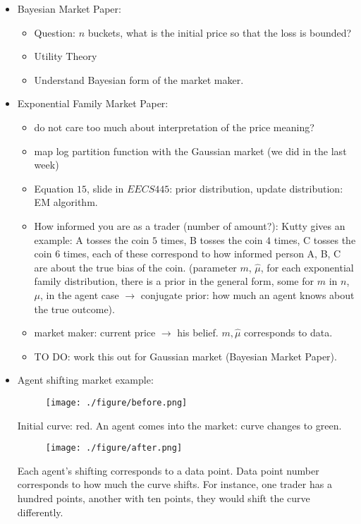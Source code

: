 \documentclass{article}
\begin{document}
\begin{itemize}
\item Bayesian Market Paper: 
	\begin{itemize}
		\item Question: $n$ buckets, what is the initial price so that the loss is bounded?
		\item Utility Theory
		\item Understand Bayesian form of the market maker.
	\end{itemize} 
\item Exponential Family Market Paper:
	\begin{itemize}

		\item do not care too much about interpretation of the price meaning?
		\item map log partition function with the Gaussian market (we did in the last week)
		\item Equation $15$, slide in $EECS445$: prior distribution, update distribution: EM algorithm.
		\item How informed you are as a trader (number of amount?): Kutty gives an example: A tosses the coin $5$ times, B tosses the coin $4$ times, C tosses the coin $6$ times, each of these correspond to how informed person A, B, C are about the true bias of the coin. (parameter $m$, $\hat{\mu}$, for each exponential family distribution, there is a prior in the general form, some for $m$ in $n$, $\mu$, in the agent case $\rightarrow$ conjugate prior: how much an agent knows about the true outcome).
		\item market maker: current price $\rightarrow$ his belief. $m, \hat{\mu}$ corresponds to data.
		\item TO DO: work this out for Gaussian market (Bayesian Market Paper). 
	\end{itemize}
\item Agent shifting market example:
	\begin{figure}[H]
		\centering
		\texttt{[image: ./figure/before.png]}
	\end{figure}
	Initial curve: red. An agent comes into the market: curve changes to green.
	\begin{figure}[H]
\centering
\texttt{[image: ./figure/after.png]}
\end{figure}
Each agent's shifting corresponds to a data point. Data point number corresponds to how much the curve shifts. For instance, one trader has a hundred points, another with ten points, they would shift the curve differently. 


\end{itemize}
\end{document}
